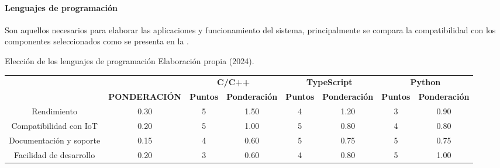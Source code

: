 \paragraph{Lenguajes de programación}
Son aquellos necesarios para elaborar las aplicaciones y funcionamiento del sistema, principalmente se compara la compatibilidad con los componentes seleccionados como se presenta en la .
\begin{tabla}[leng] 
{Elección de los lenguajes de programación}
{Elaboración propia (2024).}
\centering
\resizebox{15cm}{!}
{
\begin{tabular}{|c|c|c|c|c|c|c|c|} 
\hline
\rowcolor[rgb]{0.678,0.702,0.698} {\cellcolor[rgb]{0.678,0.702,0.698}}                                    & {\cellcolor[rgb]{0.678,0.702,0.698}}                                       & \multicolumn{2}{c|}{\textbf{C/C++}}    & \multicolumn{2}{c|}{\textbf{TypeScript}} & \multicolumn{2}{c|}{\textbf{Python}}    \\
\rowcolor[rgb]{0.678,0.702,0.698} \multirow{-2}{*}{{\cellcolor[rgb]{0.678,0.702,0.698}}\textbf{CRITERIO}} & \multirow{-2}{*}{{\cellcolor[rgb]{0.678,0.702,0.698}}\textbf{PONDERACIÓN}} & \textbf{Puntos} & \textbf{Ponderación} & \textbf{Puntos} & \textbf{Ponderación}   & \textbf{Puntos} & \textbf{Ponderación}  \\ 
\hline
\rowcolor[rgb]{0.027,0.894,0.698} Rendimiento                                                             & 0.30                                                                       & 5               & 1.50                 & 4               & 1.20                   & 3               & 0.90                  \\ 
\hline
\rowcolor[rgb]{0.027,0.894,0.675} Compatibilidad con IoT                                                  & 0.20                                                                       & 5               & 1.00                 & 5               & 0.80                   & 4               & 0.80                  \\ 
\hline
Documentación y soporte                                                                                   & 0.15                                                                       & 4               & 0.60                 & 5               & 0.75                   & 5               & 0.75                  \\ 
\hline
\rowcolor[rgb]{0.027,0.894,0.675} Facilidad de desarrollo                                                 & 0.20                                                                       & 3               & 0.60                 & 4               & 0.80                   & 5               & 1.00                  \\ 

\end{tabular}}
\end{tabla}
